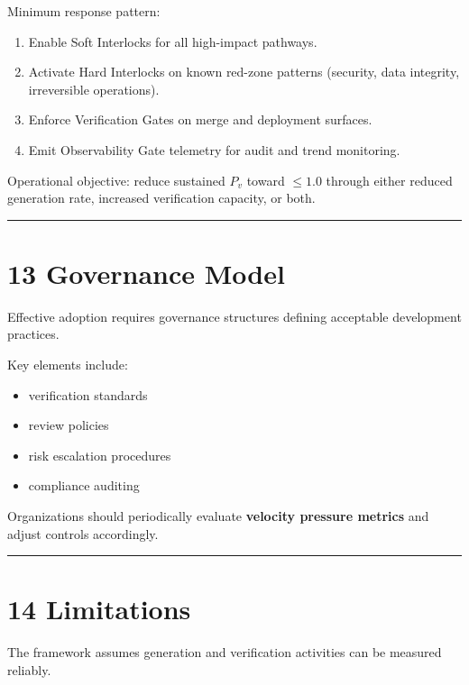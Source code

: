 \documentclass[
]{article}
\providecommand{\tightlist}{%
  \setlength{\itemsep}{0pt}\setlength{\parskip}{0pt}}
\begin{document}
Minimum response pattern:

\begin{enumerate}
\def\labelenumi{\arabic{enumi}.}
\tightlist
\item
  Enable Soft Interlocks for all high-impact pathways.
\item
  Activate Hard Interlocks on known red-zone patterns (security, data
  integrity, irreversible operations).
\item
  Enforce Verification Gates on merge and deployment surfaces.
\item
  Emit Observability Gate telemetry for audit and trend monitoring.
\end{enumerate}

Operational objective: reduce sustained \(P_v\) toward \(\leq 1.0\)
through either reduced generation rate, increased verification capacity,
or both.

\begin{center}\rule{0.5\linewidth}{0.5pt}\end{center}

\section{13 Governance Model}\label{13-governance-model}

Effective adoption requires governance structures defining acceptable
development practices.

Key elements include:

\begin{itemize}
\tightlist
\item
  verification standards
\item
  review policies
\item
  risk escalation procedures
\item
  compliance auditing
\end{itemize}

Organizations should periodically evaluate \textbf{velocity pressure
metrics} and adjust controls accordingly.

\begin{center}\rule{0.5\linewidth}{0.5pt}\end{center}

\section{14 Limitations}\label{14-limitations}

The framework assumes generation and verification activities can be
measured reliably.
\end{document}
